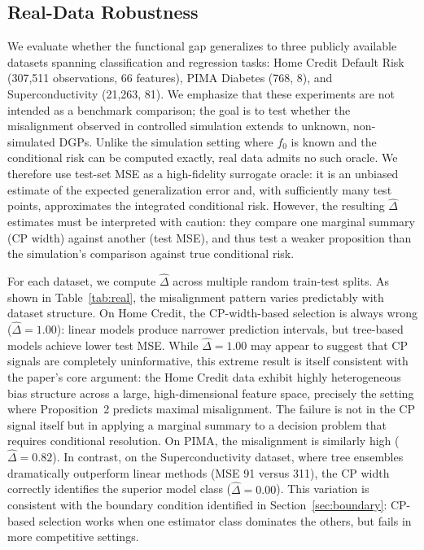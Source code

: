 \documentclass[a4paper,11pt]{article}
\begin{document}
\subsection{Real-Data Robustness}
\label{sec:real-data}

We evaluate whether the functional gap generalizes to three publicly available datasets spanning classification and regression tasks: Home Credit Default Risk (307,511 observations, 66 features), PIMA Diabetes (768, 8), and Superconductivity (21,263, 81). We emphasize that these experiments are not intended as a benchmark comparison; the goal is to test whether the misalignment observed in controlled simulation extends to unknown, non-simulated DGPs. Unlike the simulation setting where $f_0$ is known and the conditional risk can be computed exactly, real data admits no such oracle. We therefore use test-set MSE as a high-fidelity surrogate oracle: it is an unbiased estimate of the expected generalization error and, with sufficiently many test points, approximates the integrated conditional risk. However, the resulting $\hat{\Delta}$ estimates must be interpreted with caution: they compare one marginal summary (CP width) against another (test MSE), and thus test a weaker proposition than the simulation's comparison against true conditional risk.

For each dataset, we compute $\hat{\Delta}$ across multiple random train-test splits. As shown in Table~\ref{tab:real}, the misalignment pattern varies predictably with dataset structure. On Home Credit, the CP-width-based selection is always wrong ($\hat{\Delta} = 1.00$): linear models produce narrower prediction intervals, but tree-based models achieve lower test MSE. While $\hat{\Delta} = 1.00$ may appear to suggest that CP signals are completely uninformative, this extreme result is itself consistent with the paper's core argument: the Home Credit data exhibit highly heterogeneous bias structure across a large, high-dimensional feature space, precisely the setting where Proposition~2 predicts maximal misalignment. The failure is not in the CP signal itself but in applying a marginal summary to a decision problem that requires conditional resolution. On PIMA, the misalignment is similarly high ($\hat{\Delta} = 0.82$). In contrast, on the Superconductivity dataset, where tree ensembles dramatically outperform linear methods (MSE 91 versus 311), the CP width correctly identifies the superior model class ($\hat{\Delta} = 0.00$). This variation is consistent with the boundary condition identified in Section~\ref{sec:boundary}: CP-based selection works when one estimator class dominates the others, but fails in more competitive settings.
\end{document}
